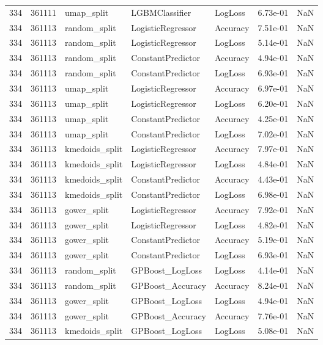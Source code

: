 \begin{tabular}{rrlllrr}
334 & 361111 & umap\_split & LGBMClassifier & LogLoss & 6.73e-01 & NaN \\
334 & 361113 & random\_split & LogisticRegressor & Accuracy & 7.51e-01 & NaN \\
334 & 361113 & random\_split & LogisticRegressor & LogLoss & 5.14e-01 & NaN \\
334 & 361113 & random\_split & ConstantPredictor & Accuracy & 4.94e-01 & NaN \\
334 & 361113 & random\_split & ConstantPredictor & LogLoss & 6.93e-01 & NaN \\
334 & 361113 & umap\_split & LogisticRegressor & Accuracy & 6.97e-01 & NaN \\
334 & 361113 & umap\_split & LogisticRegressor & LogLoss & 6.20e-01 & NaN \\
334 & 361113 & umap\_split & ConstantPredictor & Accuracy & 4.25e-01 & NaN \\
334 & 361113 & umap\_split & ConstantPredictor & LogLoss & 7.02e-01 & NaN \\
334 & 361113 & kmedoids\_split & LogisticRegressor & Accuracy & 7.97e-01 & NaN \\
334 & 361113 & kmedoids\_split & LogisticRegressor & LogLoss & 4.84e-01 & NaN \\
334 & 361113 & kmedoids\_split & ConstantPredictor & Accuracy & 4.43e-01 & NaN \\
334 & 361113 & kmedoids\_split & ConstantPredictor & LogLoss & 6.98e-01 & NaN \\
334 & 361113 & gower\_split & LogisticRegressor & Accuracy & 7.92e-01 & NaN \\
334 & 361113 & gower\_split & LogisticRegressor & LogLoss & 4.82e-01 & NaN \\
334 & 361113 & gower\_split & ConstantPredictor & Accuracy & 5.19e-01 & NaN \\
334 & 361113 & gower\_split & ConstantPredictor & LogLoss & 6.93e-01 & NaN \\
334 & 361113 & random\_split & GPBoost\_LogLoss & LogLoss & 4.14e-01 & NaN \\
334 & 361113 & random\_split & GPBoost\_Accuracy & Accuracy & 8.24e-01 & NaN \\
334 & 361113 & gower\_split & GPBoost\_LogLoss & LogLoss & 4.94e-01 & NaN \\
334 & 361113 & gower\_split & GPBoost\_Accuracy & Accuracy & 7.76e-01 & NaN \\
334 & 361113 & kmedoids\_split & GPBoost\_LogLoss & LogLoss & 5.08e-01 & NaN \\

\end{tabular}
